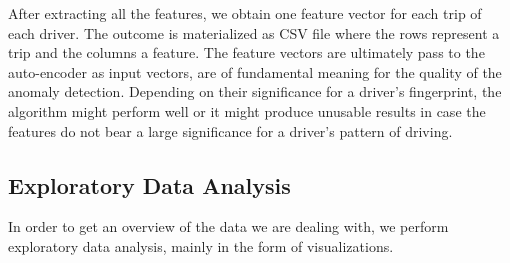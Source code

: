 \documentclass{vldb}
\begin{document}

After extracting all the features, we obtain one feature vector for each trip of each driver. The outcome is materialized as CSV file where the rows represent a trip and the columns a feature. The feature vectors are ultimately pass to the auto-encoder as input vectors, are of fundamental meaning for the quality of the anomaly detection. Depending on their significance for a driver's fingerprint, the algorithm might perform well or it might produce unusable results in case the features do not bear a large significance for a driver's pattern of driving. 

\subsection{Exploratory Data Analysis}
In order to get an overview of the data we are dealing with, we perform exploratory data analysis, mainly in the form of visualizations.  
\end{document}
